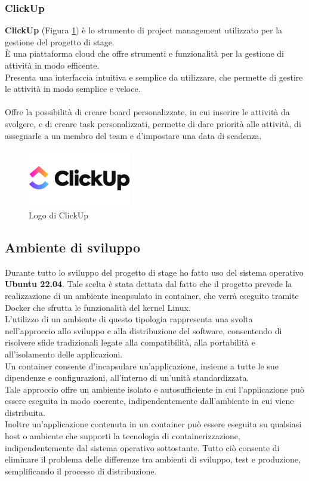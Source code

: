 \subsubsection{ClickUp}   %
\textbf{ClickUp} (Figura \ref{fig:clickup}) è lo strumento di project management utilizzato per la gestione del progetto di stage.\\ 
È una piattaforma cloud che offre strumenti e funzionalità per la gestione di attività in modo efficente.\\
Presenta una interfaccia intuitiva e semplice da utilizzare, che permette di gestire le attività in modo semplice e veloce.\\
\pagebreak
\\
Offre la possibilità di creare \gls{board}{} personalizzate, in cui inserire le attività da svolgere, e di creare \gls{task}{} personalizzati,
permette di dare priorità alle attività, di assegnarle a un membro del team e d'impostare una data di scadenza.\\

\begin{figure}[h]
    \centering
    \includegraphics[width=0.4\textwidth]{images/tecnologie/logo_clickup.png}
    \caption{Logo di ClickUp}
    \label{fig:clickup}
\end{figure}
\subsection{Ambiente di sviluppo}
Durante tutto lo sviluppo del progetto di stage ho fatto uso del sistema operativo \textbf{Ubuntu 22.04}. Tale scelta è stata 
dettata dal fatto che il progetto prevede la realizzazione di un ambiente incapsulato in container, che verrà eseguito tramite \gls{Docker}{} che 
sfrutta le funzionalità del kernel Linux.\\
L'utilizzo di un ambiente di questo tipologia rappresenta una svolta nell'approccio allo sviluppo e alla distribuzione del software, consentendo di risolvere sfide tradizionali legate alla compatibilità, alla portabilità e all'isolamento delle applicazioni.\\
Un \gls{container}{} consente d'incapsulare un'applicazione, insieme a tutte le sue dipendenze e configurazioni, all'interno di un'unità standardizzata.
\\Tale approccio offre un ambiente isolato e autosufficiente in cui l'applicazione può essere eseguita in modo coerente, indipendentemente dall'ambiente in cui viene distribuita.
\\Inoltre un'applicazione contenuta in un \gls{container}{} può essere eseguita su qualsiasi host o ambiente che supporti la tecnologia di containerizzazione, indipendentemente dal sistema operativo sottostante. 
Tutto ciò consente di eliminare il problema delle differenze tra ambienti di sviluppo, test e produzione, semplificando il processo di distribuzione.
